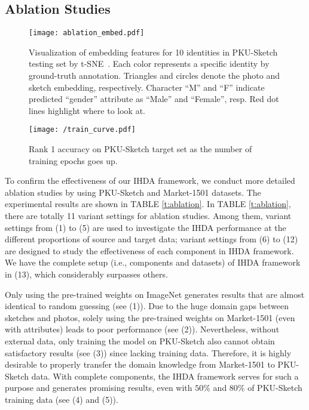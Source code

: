 \documentclass[journal]{IEEEtran}
\begin{document}
\subsection{Ablation Studies}

\begin{figure*}[!ht]
\centering
  \texttt{[image: ablation\_embed.pdf]}
  \caption{Visualization of embedding features for 10 identities in PKU-Sketch testing set by t-SNE~\cite{maaten2008visualizing}. Each color represents a specific identity by ground-truth annotation. Triangles and circles denote the photo and sketch embedding, respectively. Character ``M'' and ``F'' indicate predicted ``gender'' attribute as ``Male'' and ``Female'', resp. Red dot lines highlight where to look at. }
  \label{fig:embed}
\end{figure*}

\begin{figure}[!ht]
\centering
  \texttt{[image: /train\_curve.pdf]}
  \caption{Rank 1 accuracy on PKU-Sketch target set as the number of training epochs goes up.}
  \label{fig:embed-2}
\end{figure}


To confirm the effectiveness of our IHDA framework, we conduct more detailed ablation studies by using PKU-Sketch and Market-1501 datasets. The experimental results are shown in TABLE \ref{t:ablation}. In TABLE \ref{t:ablation}, there are totally 11 variant settings for ablation studies. Among them, variant settings from (1) to (5) are used to investigate the IHDA performance at the different proportions of source and target data; variant settings from (6) to (12) are designed to study the effectiveness of each component in IHDA framework. We have the complete setup (i.e., components and datasets) of IHDA framework in (13), which considerably surpasses others. 


Only using the pre-trained weights on ImageNet generates results that are almost identical to random guessing (see (1)). Due to the huge domain gaps between sketches and photos, solely using the pre-trained weights on Market-1501 (even with attributes) leads to poor performance (see (2)). Nevertheless, without external data, only training the model on PKU-Sketch also cannot obtain satisfactory results (see (3)) since lacking training data. Therefore, it is highly desirable to properly transfer the domain knowledge from Market-1501 to PKU-Sketch data. With complete components, the IHDA framework serves for such a purpose and generates promising results, even with $50\%$ and $80\%$ of PKU-Sketch training data (see (4) and (5)). 
\end{document}
